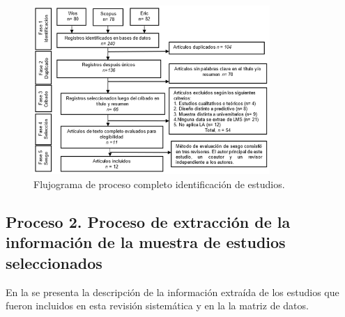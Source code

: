 \documentclass[spanish]{textolivre}
\begin{document}
\begin{figure}[htbp]
 \centering
 \includegraphics[width=0.8\textwidth]{36310-fig1.png}
 \caption{Flujograma de proceso completo identificación de estudios.}
 \label{fig1}
\end{figure}

\subsection{Proceso 2. Proceso de extracción de la información de la muestra de estudios seleccionados}
En la  se presenta la descripción de la información extraída de los estudios que fueron incluidos en esta revisión sistemática y en la  la matriz de datos.
\end{document}
